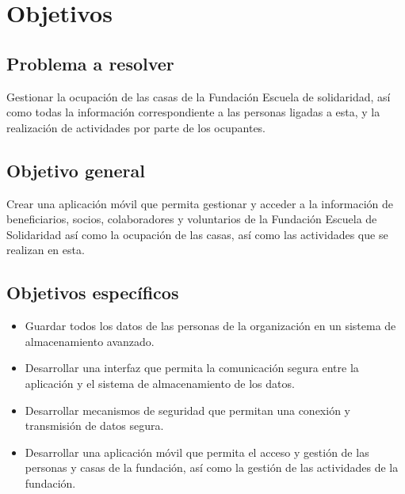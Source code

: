 \section{Objetivos}

\subsection{Problema a resolver}

Gestionar la ocupación de las casas de la Fundación Escuela de solidaridad, así como todas la información correspondiente a las personas ligadas a esta, y la realización de actividades por parte de los ocupantes.

\subsection{Objetivo general}

Crear una aplicación móvil que permita gestionar y acceder a la información de beneficiarios, socios, colaboradores y voluntarios de la Fundación Escuela de Solidaridad así como la ocupación de las casas, así como las actividades que se realizan en esta.

\subsection{Objetivos específicos}

\begin{itemize}
    \item Guardar todos los datos de las personas de la organización en un sistema de almacenamiento avanzado.
    \item Desarrollar una interfaz que permita la comunicación segura entre la aplicación y el sistema de almacenamiento de los datos.
    \item Desarrollar mecanismos de seguridad que permitan una conexión y transmisión de datos segura.
    \item Desarrollar una aplicación móvil que permita el acceso y gestión de las personas y casas de la fundación, así como la gestión de las actividades de la fundación.
\end{itemize}